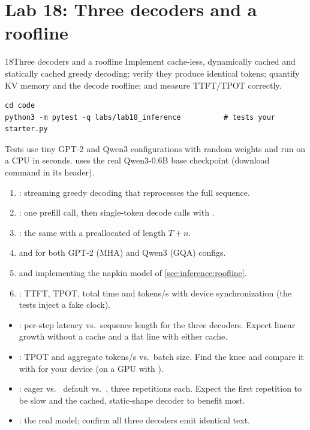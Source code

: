 \section{Lab 18: Three decoders and a roofline}\label{sec:inference:lab}
\begin{labbox}{18}{Three decoders and a roofline}
Implement cache-less, dynamically cached and statically cached greedy decoding; verify they produce
identical tokens; quantify KV memory and the decode roofline; and measure TTFT/TPOT correctly.

\begin{lstlisting}[style=shell]
cd code
python3 -m pytest -q labs/lab18_inference          # tests your starter.py
\end{lstlisting}
Tests use tiny GPT-2 and Qwen3 configurations with random weights and run on a CPU in seconds.
 uses the real Qwen3-0.6B base checkpoint (download command in its header).

\begin{enumerate}
  \item {}: streaming greedy decoding that reprocesses the full sequence.
  \item {}: one prefill call, then single-token decode calls with .
  \item {}: the same with a preallocated  of length $T+n$.
  \item {} and  for both GPT-2 (MHA) and Qwen3 (GQA) configs.
  \item {} and  implementing the napkin model of \cref{sec:inference:roofline}.
  \item {}: TTFT, TPOT, total time and tokens/s with device synchronization
    (the tests inject a fake clock).
\end{enumerate}

\begin{itemize}
  \item {}: per-step latency vs.\ sequence length for the
    three decoders. Expect linear growth without a cache and a flat line with either cache.
  \item {}: TPOT and aggregate tokens/s vs.\ batch size. Find the knee and
    compare it with  for your device (on a GPU with ).
  \item {}: eager vs.\  default vs.\
    , three repetitions each. Expect the first repetition to be slow and the
    cached, static-shape decoder to benefit most.
  \item {}: the real model; confirm all three decoders emit identical text.
\end{itemize}


\end{labbox}
